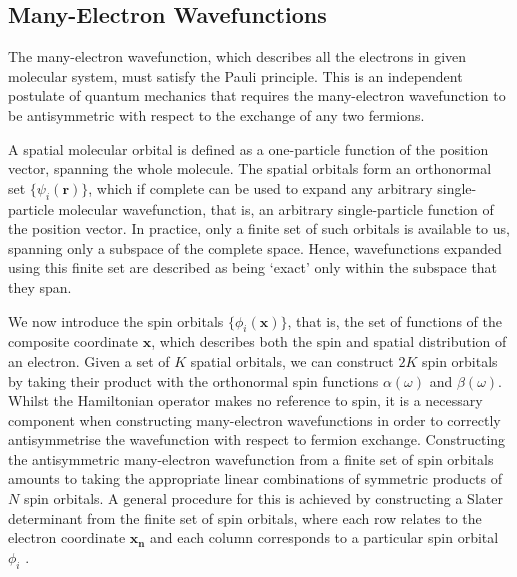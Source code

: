 
\subsection{\label{many-electron-wavefunctions}Many-Electron Wavefunctions}


The many-electron wavefunction, which describes all the electrons in given molecular system, must satisfy the Pauli principle. This is an independent postulate of quantum mechanics that requires the many-electron wavefunction to be antisymmetric with respect to the exchange of any two fermions.

A spatial molecular orbital is defined as a one-particle function of the position vector, spanning the whole molecule. The spatial orbitals form an orthonormal set $\{\psi_i(\mathbf{r})\}$, which if complete can be used to expand any arbitrary single-particle molecular wavefunction, that is, an arbitrary single-particle function of the position vector. In practice, only a finite set of such orbitals is available to us, spanning only a subspace of the complete space. Hence, wavefunctions expanded using this finite set are described as being `exact' only within the subspace that they span.

We now introduce the spin orbitals $\{\phi_i(\mathbf{x})\}$, that is, the set of functions of the composite coordinate $\mathbf{x}$, which describes both the spin and spatial distribution of an electron. Given a set of $K$ spatial orbitals, we can construct $2K$ spin orbitals by taking their product with the orthonormal spin functions $\alpha(\omega)$ and $\beta(\omega)$. Whilst the Hamiltonian operator makes no reference to spin, it is a necessary component when constructing many-electron wavefunctions in order to correctly antisymmetrise the wavefunction with respect to fermion exchange. Constructing the antisymmetric many-electron wavefunction from a finite set of spin orbitals amounts to taking the appropriate linear combinations of symmetric products of $N$ spin orbitals. A general procedure for this is achieved by constructing a Slater determinant from the finite set of spin orbitals, where each row relates to the electron coordinate $\mathbf{x_n}$ and each column corresponds to a particular spin orbital $\phi_i$ \cite{Atilla1996}. 

